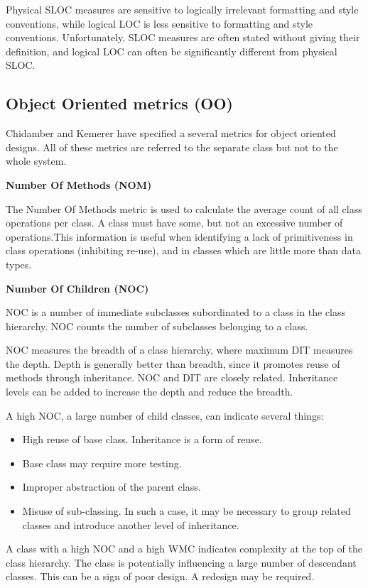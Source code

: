 Physical SLOC measures are sensitive to logically irrelevant formatting and style conventions, while logical LOC is less sensitive to formatting and style conventions. Unfortunately, SLOC measures are often stated without giving their definition, and logical LOC can often be significantly different from physical SLOC.

\subsection{Object Oriented metrics (OO)}

Chidamber and Kemerer have specified a several metrics for object oriented
designs. All of these metrics are referred to the separate class but not to the whole system.

\textbf{Number Of Methods (NOM)}

The Number Of Methods metric is used to calculate the average count of all class operations per class. A class must have some, but not an excessive number of operations.This information is useful when identifying a lack of primitiveness in class operations (inhibiting
re-use), and in classes which are little more than data types.

\textbf{Number Of Children (NOC)}

NOC is a number of immediate subclasses subordinated to a class in the class hierarchy. NOC counts the number of subclasses belonging to a class.

NOC measures the breadth of a class hierarchy, where maximum DIT measures the depth. Depth is generally better than breadth, since it promotes reuse of methods through inheritance. NOC and DIT are closely related. Inheritance levels can be added to increase the depth and reduce the breadth.

A high NOC, a large number of child classes, can indicate several things: 
\begin{itemize}
	\item High reuse of base class. Inheritance is a form of reuse.
	\item Base class may require more testing.
	\item Improper abstraction of the parent class. 
	\item Misuse of sub-classing. In such a case, it may be necessary to group related classes and introduce another level of inheritance.
\end{itemize}

A class with a high NOC and a high WMC indicates complexity at the top of the class hierarchy. The class is potentially influencing a large number of descendant classes. This can be a sign of poor design. A redesign may be required.

